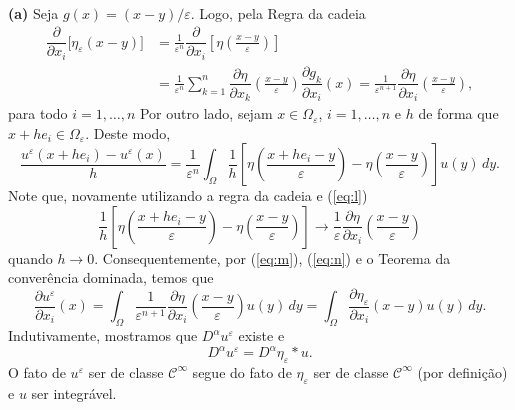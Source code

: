 \documentclass[a4paper, 11pt]{book}
\theoremstyle{definition}
\newcommand{\cC}{\mathcal{C}}
\begin{document}
\begin{prf}
    ~

    \textbf{(a)} Seja $g(x) = (x-y)/\varepsilon $. Logo, pela Regra da cadeia
    \begin{equation} \label{eq:l}
        \begin{aligned}
            \dfrac{\partial}{\partial x_i} \big[\eta_\varepsilon(x-y)\big] &= \frac{1}{\varepsilon^n}\dfrac{\partial }{\partial x_i}\left[\eta\left( \frac{x - y}{\varepsilon} \right) \right]\\ &= \frac{1}{\varepsilon^n} \sum_{k =1}^n \dfrac{\partial \eta}{\partial x_k}\left( \frac{x - y}{\varepsilon} \right) \dfrac{\partial g_k}{\partial x_i}(x) = \frac{1}{\varepsilon^{n+1}} \dfrac{\partial \eta}{\partial x_i}\left( \frac{x - y}{\varepsilon} \right),
        \end{aligned}
    \end{equation}
    para todo $i = 1,\dots,n$ Por outro lado, sejam $x \in \Omega_\varepsilon$, $i = 1,\dots,n$ e $h$ de forma que $x + he_i \in \Omega_\varepsilon$. Deste modo,
    \begin{equation} \label{eq:m}
        \frac{u^\varepsilon(x + he_i) - u^\varepsilon(x)}{h} 
            = \frac{1}{\varepsilon^n} \int_\Omega \frac{1}{h}\left[  \eta\left( \frac{x + he_i - y}{\varepsilon} \right) - \eta\left( \frac{x -y}{\varepsilon} \right) \right] u(y) \,dy.
    \end{equation} 
    Note que, novamente utilizando a regra da cadeia e (\ref{eq:l})
    \begin{equation} \label{eq:n}
        \frac{1}{h}\left[  \eta\left( \frac{x + he_i - y}{\varepsilon} \right) - \eta\left( \frac{x -y}{\varepsilon} \right) \right] \to \frac{1}{\varepsilon}\dfrac{\partial \eta}{\partial x_i}\left( \frac{x - y}{\varepsilon} \right)
    \end{equation}
    quando $h \to 0$. Consequentemente, por (\ref{eq:m}), (\ref{eq:n}) e o Teorema da converência dominada, temos que
    \[
        \dfrac{\partial u^\varepsilon}{\partial x_i}(x) = \int_\Omega \frac{1}{\varepsilon^{n+1}} \dfrac{\partial \eta}{\partial x_i}\left( \frac{x - y}{\varepsilon} \right) u(y) \,dy = \int_\Omega \dfrac{\partial \eta_\varepsilon}{\partial x_i} (x-y) u(y) \,dy.
    \]
    Indutivamente, mostramos que $D^\alpha u^\varepsilon$ existe e
    \[
        D^\alpha u^\varepsilon = D^\alpha\eta_\varepsilon * u.
    \]
    O fato de $u^\varepsilon$ ser de classe $\cC^\infty$ segue do fato de $\eta_\varepsilon$ ser de classe $\cC^\infty$ (por definição) e $u$ ser integrável.


\end{prf}
\end{document}
